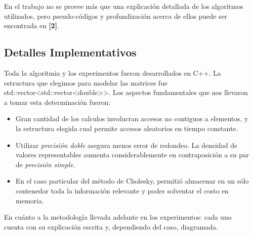En el trabajo no se provee m\'as que una explicaci\'on detallada de los algoritmos utilizados, pero pseudo-c\'odigos y profundizaci\'on acerca de ellos puede ser encontrada en \textbf{[2]}.

\subsection{Detalles Implementativos}

Toda la algoritmia y los experimentos fueron desarrollados en C++. La estructura que elegimos para modelar las matrices fue std::vector\textless std::vector\textless double\textgreater\textgreater. Los aspectos fundamentales que nos llevaron a tomar esta determinaci\'on fueron:

\begin{itemize}
\item Gran cantidad de los calculos involucran accesos no contiguos a elementos, y la estructura elegida cual permite accesos aleatorios en tiempo constante.
\item Utilizar \textit{precisi\'on doble} asegura menos error de redondeo. La densidad de valores representables aumenta considerablemente en contraposici\'on a su par de \textit{precisi\'on simple}.
\item En el caso particular del m\'etodo de Cholesky, permiti\'o almacenar en un s\'olo contenedor toda la informaci\'on relevante y poder solventar el costo en memoria.
\end{itemize}

En cu\'anto a la metodolog\'ia llevada adelante en los experimentos: cada uno cuenta con su explicaci\'on escrita y, dependiendo del caso, diagramada.